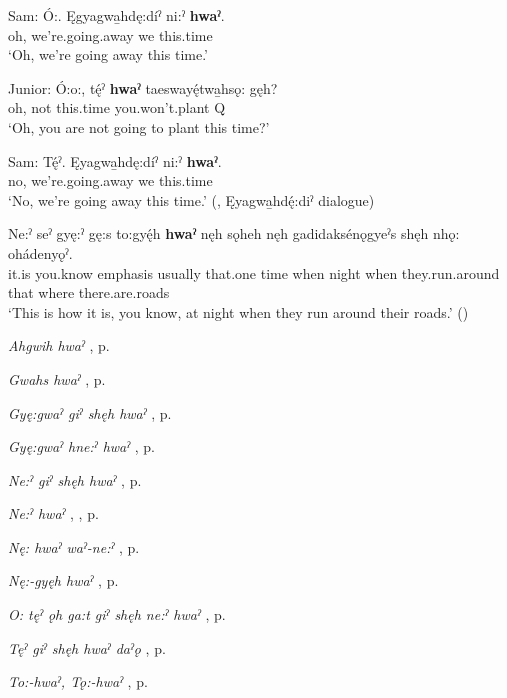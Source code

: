 \gll Sam: Ó:. Ęgyagwa̱hdę:díˀ ni:ˀ \textbf{hwaˀ}.\\
{} oh, we’re.going.away we this.time\\
\glt ‘Oh, we’re going away this time.’

\gll Junior: Ó:o:, tę́ˀ \textbf{hwaˀ} taeswayę́twa̱hsǫ: gęh? \\
{} oh, not this.time you.won’t.plant Q\\
\glt ‘Oh, you are not going to plant this time?’

\gll Sam: Tę́ˀ. Ęyagwa̱hdę:díˀ ni:ˀ \textbf{hwaˀ}.\\
{} no, we’re.going.away we this.time\\
\glt ‘No, we’re going away this time.’ (\cite[402]{mithun_watewayestanih_1984},  Ęyagwa̱hdę́:diˀ dialogue)
\z



\ea
\label{ex:hpar60}
\gll Ne:ˀ seˀ gyę:ˀ gę:s to:gyę́h \textbf{hwaˀ} nęh sǫheh nęh gadidaksénǫgyeˀs shęh nhǫ: ohádenyǫˀ.\\
it.is you.know emphasis usually that.one time when night when they.run.around that where there.are.roads\\
\glt ‘This is how it is, you know, at night when they run around their roads.’ (\cite{mithun_how_1980})
\z


\begin{CayugaRelated}
\item \textit{Ahgwih hwaˀ} , p. \pageref{p:[ahgwih hwaˀ]}\\
\item \textit{Gwahs hwaˀ} , p. \pageref{p:[gwahs hwaˀ]}\\
\item \textit{Gyę:gwaˀ giˀ shęh hwaˀ} , p. \pageref{p:[gyę:gwaˀ giˀ shęh hwaˀ]}\\
\item \textit{Gyę:gwaˀ hne:ˀ hwaˀ} , p. \pageref{p:[gyę:gwaˀ hne:ˀ hwaˀ]}\\
\item \textit{Ne:ˀ giˀ shęh hwaˀ} , p. \pageref{p:[ne:ˀ giˀ shęh hwaˀ]}\\
\item \textit{Ne:ˀ hwaˀ} , , p. \pageref{p:[ne:ˀ hwaˀ]}\\
\item \textit{Nę: hwaˀ waˀ-ne:ˀ} , p. \pageref{p:[nę: hwaˀ waˀ-ne:ˀ]}\\
\item \textit{Nę:-gyęh hwaˀ} , p. \pageref{p:[nę:-gyęh hwaˀ] ‘this time’}\\
\item \textit{O: tęˀ ǫh ga:t giˀ shęh ne:ˀ hwaˀ} , p. \pageref{p:[o: tęˀ ǫh ga:t giˀ shęh ne:ˀ hwaˀ]}\\
\item \textit{Tęˀ giˀ shęh hwaˀ daˀǫ} , p. \pageref{p:[tęˀ giˀ shęh hwaˀ daˀǫ]}\\
\item \textit{To:-hwaˀ, Tǫ:-hwaˀ} , p. \pageref{p:[tǫ:-hwaˀ]}
\end{CayugaRelated}


